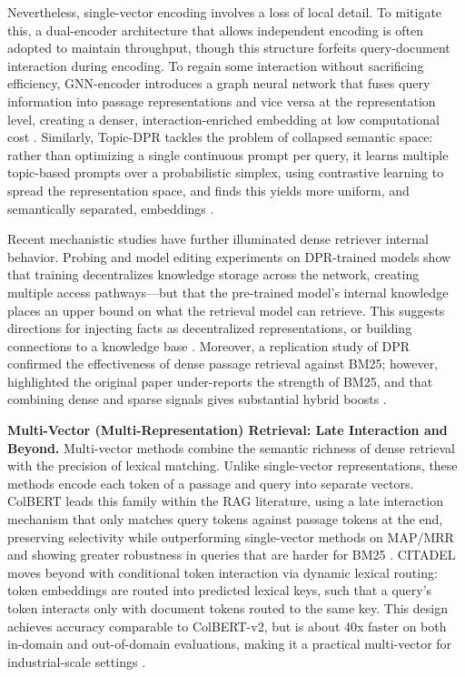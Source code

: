 \documentclass[11pt]{article}
\begin{document}
Nevertheless, single-vector encoding involves a loss of local detail. To mitigate this, a dual-encoder architecture that allows independent encoding is often adopted to maintain throughput, though this structure forfeits query-document interaction during encoding. To regain some interaction without sacrificing efficiency, GNN-encoder introduces a graph neural network that fuses query information into passage representations and vice versa at the representation level, creating a denser, interaction-enriched embedding at low computational cost \cite{ref13}. Similarly, Topic-DPR tackles the problem of collapsed semantic space: rather than optimizing a single continuous prompt per query, it learns multiple topic-based prompts over a probabilistic simplex, using contrastive learning to spread the representation space, and finds this yields more uniform, and semantically separated, embeddings \cite{ref14}.

Recent mechanistic studies have further illuminated dense retriever internal behavior. Probing and model editing experiments on DPR-trained models show that training decentralizes knowledge storage across the network, creating multiple access pathways---but that the pre-trained model's internal knowledge places an upper bound on what the retrieval model can retrieve. This suggests directions for injecting facts as decentralized representations, or building connections to a knowledge base \cite{ref15}. Moreover, a replication study of DPR confirmed the effectiveness of dense passage retrieval against BM25; however, highlighted the original paper under-reports the strength of BM25, and that combining dense and sparse signals gives substantial hybrid boosts \cite{ref16}.

\textbf{Multi-Vector (Multi-Representation) Retrieval: Late Interaction and Beyond.} Multi-vector methods combine the semantic richness of dense retrieval with the precision of lexical matching. Unlike single-vector representations, these methods encode each token of a passage and query into separate vectors. ColBERT leads this family within the RAG literature, using a late interaction mechanism that only matches query tokens against passage tokens at the end, preserving selectivity while outperforming single-vector methods on MAP/MRR and showing greater robustness in queries that are harder for BM25 \cite{ref11}. CITADEL moves beyond with conditional token interaction via dynamic lexical routing: token embeddings are routed into predicted lexical keys, such that a query's token interacts only with document tokens routed to the same key. This design achieves accuracy comparable to ColBERT-v2, but is about 40x faster on both in-domain and out-of-domain evaluations, making it a practical multi-vector for industrial-scale settings \cite{ref17}.
\end{document}
